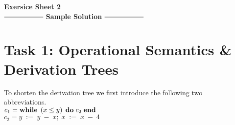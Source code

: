 \documentclass[12pt]{scrartcl}
\begin{document}
	\begin{center}
		\huge\textbf{Exersice Sheet 2}\\[0.5cm]
	
		\Large
		$\mathrel{\vcenter{\hbox{\rule{2cm}{0.5pt}}}}$ \textbf{Sample 				Solution} $\mathrel{\vcenter{\hbox{\rule{2cm}{0.5pt}}}}$\\[1cm]
	\end{center}
\large

	\section*{Task 1: Operational Semantics \& Derivation Trees}

	\indent\indent To shorten the derivation tree we first introduce the  following two\\\indent abbreviations.\\
	\indent\indent $c_{1}=\text{\textbf{while}}\; \left(x \leq y\right)\; \text{\textbf{do}}\; c_{2}\; \text{\textbf{end}}$\\
	\indent\indent $c_{2}= y\;:=\;y\;-\;x;\; x\;:=\;x\;-\;4$\\
\end{document}
